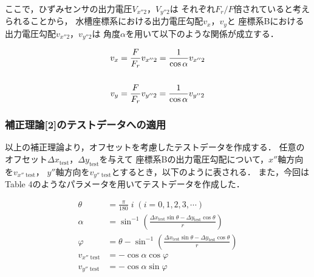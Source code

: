 ここで，ひずみセンサの出力電圧$V_{x''2}$，$V_{y''2}$は
それぞれ$F_r / F$倍されていると考えられることから，
水槽座標系における出力電圧勾配$v_{x}$，$v_{y}$と
座標系Bにおける出力電圧勾配$v_{x''2}$，$v_{y''2}$は
角度$\alpha$を用いて以下のような関係が成立する．

\begin{align}
  v_{x} & = \frac{F}{F_r} v_{x''2} = \frac{1}{\cos \alpha} v_{x''2} \\
  \notag                                                            \\
  v_{y} & = \frac{F}{F_r} v_{y''2} = \frac{1}{\cos \alpha} v_{y''2}
\end{align}

\subsubsection{補正理論[2]のテストデータへの適用}

以上の補正理論より，オフセットを考慮したテストデータを作成する．
任意のオフセット$\Delta x_\mathrm{test}$，$\Delta y_\mathrm{test}$を与えて
座標系Bの出力電圧勾配について，$x''$軸方向を$v_{x''\;\mathrm{test}}$，
$y''$軸方向を$v_{y''\;\mathrm{test}}$とするとき，以下のように表される．
また，今回はTable 4のようなパラメータを用いてテストデータを作成した．

\begin{align}
  \theta                  & = \frac{\pi}{180} \; i \;\left(i = 0, 1, 2, 3, \cdots\right)                                                       \\
  \alpha                  & = \sin^{-1} \left( \frac{\Delta x_\mathrm{test} \sin \theta - \Delta y_\mathrm{test} \cos \theta}{r} \right)       \\
  \varphi                 & = \theta - \sin^{-1}\left(\frac{\Delta x_\mathrm{test} \sin \theta - \Delta y_\mathrm{test} \cos \theta}{r}\right) \\
  v_{x'' \;\mathrm{test}} & = - \cos \alpha \cos \varphi                                                                                       \\
  v_{y'' \;\mathrm{test}} & = - \cos \alpha \sin \varphi
\end{align}

